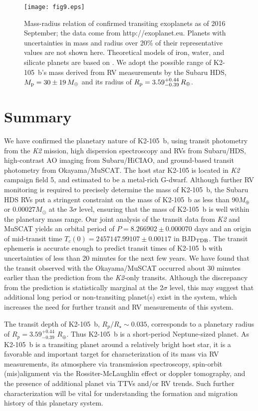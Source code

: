 \documentclass[]{pasj01}
\begin{document}
	\begin{figure}[tp]
			\texttt{[image: fig9.eps]} 
				\caption{Mass-radius relation of confirmed transiting exoplanets as of 2016 September; the data come from http://exoplanet.eu. Planets with uncertainties in mass and radius over 20\% of their representative values are not shown here. Theoretical models of iron, water, and silicate planets are based on \citet{2013PASP..125..227Z}. We adopt the possible range of K2-105~b's mass derived from RV measurements by the Subaru HDS, $M_{\rm p} = 30\pm19\,M_\oplus$ and its radius of $R_{\rm p} = 3.59^{+0.44}_{-0.39}\,R_\oplus$.}
			\label{fig_MR}
	\end{figure}

\section{Summary}

We have confirmed the planetary nature of K2-105~b,
using transit photometry from the {\it K2} mission,
high dispersion spectroscopy and RVs from Subaru/HDS,
high-contrast AO imaging from Subaru/HiCIAO,
and ground-based transit photometry from Okayama/MuSCAT.
The host star K2-105 is located in {\it K2} campaign field 5,
and estimated to be a metal-rich G-dwarf.
Although further RV monitoring is required to precisely determine the mass of K2-105~b,
the Subaru HDS RVs put a stringent constraint on the mass of K2-105~b
as less than 90$M_\oplus$ or  $0.00027M_{\odot}$ at the 3$\sigma$ level,
ensuring that the mass of K2-105~b is well within the planetary mass range.
Our joint analysis of the transit data from {\it K2} and MuSCAT
yields an orbital period of $P  = 8.266902 \pm 0.000070$ days and
an origin of mid-transit time $T_{c} (0) = 2457147.99107\pm0.00117$ in BJD$_{\rm TDB}$.
The transit ephemeris is accurate enough to predict transit times of K2-105~b
with uncertainties of less than 20 minutes for the next few years.
We have found that the transit observed with the Okayama/MuSCAT occurred
about 30 minutes earlier than the prediction from the {\it K2}-only transits.
Although the discrepancy from the prediction is statistically marginal
at the 2$\sigma$ level,
this may suggest that additional long period or non-transiting planet(s) exist in the system,
which increases the need for further transit and RV measurements of this system.

The transit depth of K2-105~b, $R_p/R_\star \sim 0.035$, corresponds to
a planetary radius of $R_p  = 3.59_{-0.39}^{+0.44}$ $R_{\oplus}$.
Thus K2-105~b is a short-period Neptune-sized planet.
As K2-105~b is a transiting planet around a relatively bright host star,
it is a favorable and important target for characterization
of its mass via RV measurements, its atmosphere via transmission spectroscopy, 
spin-orbit (mis)alignment via the Rossiter-McLaughlin effect or doppler tomography,
and the presence of additional planet via TTVs and/or RV trends.
Such further characterization will be vital for understanding
the formation and migration history of this planetary system.
\end{document}
